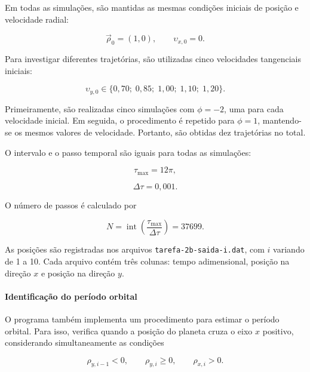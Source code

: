 \documentclass[12pt,a4paper]{article}
\begin{document}
Em todas as simulações, são mantidas as mesmas condições iniciais de posição e velocidade radial:

\begin{equation}
    \vec{\rho}_0=(1,0),
    \qquad
    \upsilon_{x,0}=0.
\end{equation}

Para investigar diferentes trajetórias, são utilizadas cinco velocidades tangenciais iniciais:

\begin{equation}
    \upsilon_{y,0}\in
    \{0,70;\;0,85;\;1,00;\;1,10;\;1,20\}.
\end{equation}

Primeiramente, são realizadas cinco simulações com $\phi=-2$, uma para cada velocidade inicial. Em seguida, o procedimento é repetido para $\phi=1$, mantendo-se os mesmos valores de velocidade. Portanto, são obtidas dez trajetórias no total.

O intervalo e o passo temporal são iguais para todas as simulações:

\begin{equation}
    \tau_{\max}=12\pi,
\end{equation}

\begin{equation}
    \Delta\tau=0,001.
\end{equation}

O número de passos é calculado por

\begin{equation}
    N=\operatorname{int}
    \left(\frac{\tau_{\max}}{\Delta\tau}\right)
    =37699.
\end{equation}

As posições são registradas nos arquivos \texttt{tarefa-2b-saida-i.dat}, com $i$ variando de 1 a 10. Cada arquivo contém três colunas: tempo adimensional, posição na direção $x$ e posição na direção $y$.

\paragraph{Identificação do período orbital}

O programa também implementa um procedimento para estimar o período orbital. Para isso, verifica quando a posição do planeta cruza o eixo $x$ positivo, considerando simultaneamente as condições

\begin{equation}
    \rho_{y,i-1}<0,
    \qquad
    \rho_{y,i}\geq 0,
    \qquad
    \rho_{x,i}>0.
\end{equation}
\end{document}

